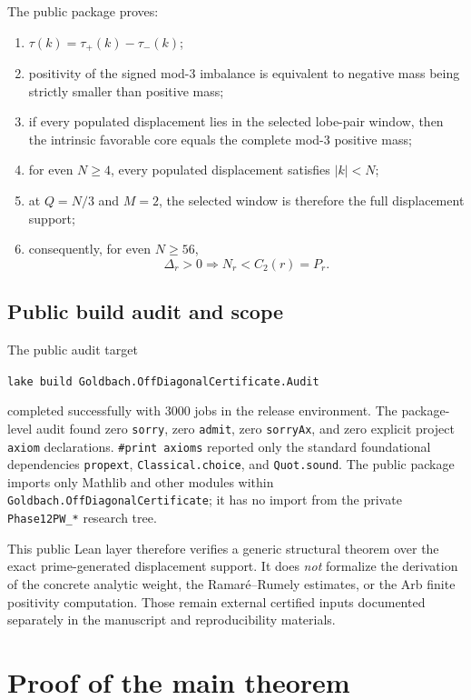 \documentclass[11pt]{article}
\theoremstyle{definition}
\newcommand{\abs}[1]{\left|#1\right|}
\begin{document}
The public package proves:
\begin{enumerate}
\item $\tau(k)=\tau_+(k)-\tau_-(k)$;
\item positivity of the signed mod-$3$ imbalance is equivalent to negative mass being strictly smaller than positive mass;
\item if every populated displacement lies in the selected lobe-pair window, then the intrinsic favorable core equals the complete mod-$3$ positive mass;
\item for even $N\ge4$, every populated displacement satisfies $\abs{k}<N$;
\item at $Q=N/3$ and $M=2$, the selected window is therefore the full displacement support;
\item consequently, for even $N\ge56$,
\begin{equation}\label{eq:leanendpoint}
\Delta_r>0\Longrightarrow N_r<C_2(r)=P_r.
\end{equation}
\end{enumerate}

\subsection{Public build audit and scope}

The public audit target
\begin{center}
\texttt{lake build Goldbach.OffDiagonalCertificate.Audit}
\end{center}
completed successfully with $3000$ jobs in the release environment. The package-level audit found zero \texttt{sorry}, zero \texttt{admit}, zero \texttt{sorryAx}, and zero explicit project \texttt{axiom} declarations. \texttt{\#print axioms} reported only the standard foundational dependencies \texttt{propext}, \texttt{Classical.choice}, and \texttt{Quot.sound}. The public package imports only Mathlib and other modules within \texttt{Goldbach.OffDiagonalCertificate}; it has no import from the private \texttt{Phase12PW\_*} research tree.

This public Lean layer therefore verifies a generic structural theorem over the exact prime-generated displacement support. It does \emph{not} formalize the derivation of the concrete analytic weight, the Ramar\'{e}--Rumely estimates, or the Arb finite positivity computation. Those remain external certified inputs documented separately in the manuscript and reproducibility materials.

\section{Proof of the main theorem}
\end{document}
